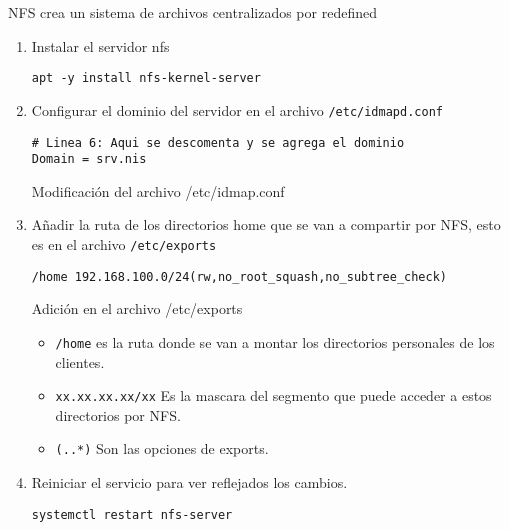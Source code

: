 \documentclass[../main.tex]{subfiles}
\begin{document}
NFS crea un sistema de archivos centralizados por redefined
\begin{enumerate}
\item Instalar el servidor nfs

  \begin{listing}[H]
  \begin{verbatim}
apt -y install nfs-kernel-server
\end{verbatim}
\end{listing}

\item Configurar el dominio del servidor en el
  archivo \texttt{/etc/idmapd.conf}

  \begin{listing}[H]
  \begin{verbatim}
# Linea 6: Aqui se descomenta y se agrega el dominio
Domain = srv.nis
\end{verbatim}
    \caption{Modificación del archivo /etc/idmap.conf}
    \label{listing:idmapd}
\end{listing}

\item Añadir la ruta de los directorios home que se van a
  compartir por NFS, esto es en el archivo \texttt{/etc/exports}

  \begin{listing}[H]
  \begin{verbatim}
/home 192.168.100.0/24(rw,no_root_squash,no_subtree_check) 
\end{verbatim}
    \caption{Adición en el archivo /etc/exports}
    \label{listing:exports}
\end{listing}

  \begin{itemize}
  \item \texttt{/home} es la ruta donde se van a montar
    los directorios personales de los clientes.
  \item \texttt{xx.xx.xx.xx/xx} Es la mascara del segmento que
    puede acceder a estos directorios por NFS.\@
  \item \texttt{(..*)} Son las opciones de exports.
  \end{itemize}

  
\item Reiniciar el servicio para ver reflejados los cambios.

  \begin{listing}[H]
  \begin{verbatim}
systemctl restart nfs-server
\end{verbatim}
\end{listing}
  
\end{enumerate}
\end{document}
